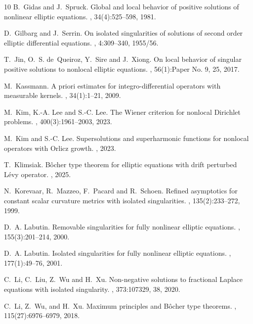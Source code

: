 \documentclass[11pt]{amsart}
\theoremstyle{plain}
\theoremstyle{definition}
\numberwithin{equation}{section}
\begin{document}
\begin{thebibliography}{10}
B.~Gidas and J.~Spruck.
\newblock Global and local behavior of positive solutions of nonlinear elliptic
  equations.
, 34(4):525--598, 1981.

D.~Gilbarg and J.~Serrin.
\newblock On isolated singularities of solutions of second order elliptic
  differential equations.
, 4:309--340, 1955/56.

T.~Jin, O.~S. de~Queiroz, Y.~Sire and J.~Xiong.
\newblock On local behavior of singular positive solutions to nonlocal elliptic
  equations.
, 56(1):Paper No. 9,
  25, 2017.

M.~Kassmann.
\newblock A priori estimates for integro-differential operators with measurable
  kernels.
, 34(1):1--21, 2009.

M.~Kim, K.-A. Lee and S.-C. Lee.
\newblock The {W}iener criterion for nonlocal {D}irichlet problems.
, 400(3):1961--2003, 2023.

M.~Kim and S.-C. Lee.
\newblock Supersolutions and superharmonic functions for nonlocal operators
  with {O}rlicz growth.
, 2023.

T.~Klimsiak.
\newblock B{\^o}cher type theorem for elliptic equations with drift perturbed
  {L}\'evy operator.
, 2025.

N.~Korevaar, R.~Mazzeo, F.~Pacard and R.~Schoen.
\newblock Refined asymptotics for constant scalar curvature metrics with
  isolated singularities.
, 135(2):233--272, 1999.

D.~A. Labutin.
\newblock Removable singularities for fully nonlinear elliptic equations.
, 155(3):201--214, 2000.

D.~A. Labutin.
\newblock Isolated singularities for fully nonlinear elliptic equations.
, 177(1):49--76, 2001.

C.~Li, C.~Liu, Z.~Wu and H.~Xu.
\newblock Non-negative solutions to fractional {L}aplace equations with
  isolated singularity.
, 373:107329, 38, 2020.

C.~Li, Z.~Wu, and H.~Xu.
\newblock Maximum principles and {B}\^ocher type theorems.
, 115(27):6976--6979, 2018.


\end{thebibliography}
\end{document}
